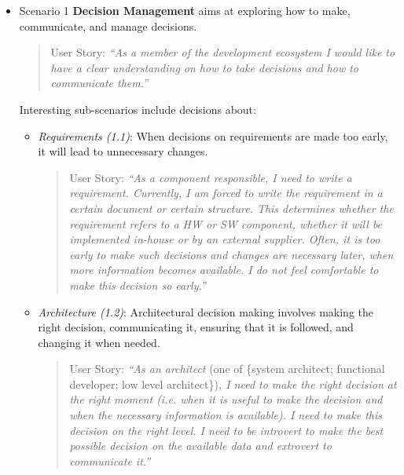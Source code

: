 \begin{itemize}
\item Scenario 1 {\bf Decision Management } aims at exploring how to make, communicate, and manage decisions. 

\begin{quote}
{User Story:} \emph{``As a member of the development ecosystem I would like to have a clear understanding on how to take decisions and how to communicate them.''}
\end{quote}


Interesting sub-scenarios include decisions about:

\begin{itemize}
\item  {\em Requirements (1.1)}: When decisions on requirements are made too early, it will lead to unnecessary changes.


\begin{quote}
{User Story:} 
\emph{``As a component responsible, I need to write a requirement. 
Currently, I am forced to write the requirement in a certain document or certain structure. 
This determines whether the requirement refers to a HW or SW component, whether it will be implemented in-house or by an external supplier. 
Often, it is too early to make such decisions and changes are necessary later, when more information becomes available. 
I do not feel comfortable to make this decision so early.''}
\end{quote}

\item {\em Architecture (1.2)}: Architectural decision making involves making the right decision, communicating it, ensuring that it is followed, and changing it when needed. 


\begin{quote}
{User Story:} 
\emph{``As an architect} (one of \{system architect; functional developer; low level architect\})\emph{, I need to make the right decision at the right moment (i.e. when it is useful to make the decision and when the necessary information is available).  
I need to make this decision on the right level. 
I need to be introvert to make the best possible decision on the available data and extrovert to communicate it.''}
\end{quote}


\end{itemize}
\end{itemize}
